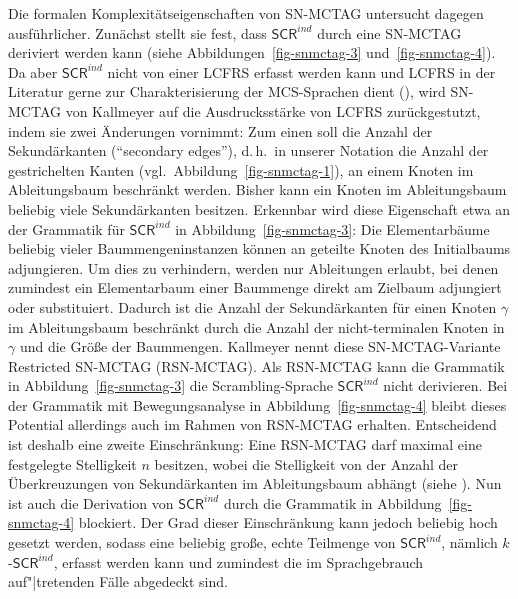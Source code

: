 Die formalen Komplexitätseigenschaften von SN-MCTAG untersucht \cite{Kallmeyer:05} dagegen ausführlicher. Zunächst stellt sie fest, dass $\mathsf{SCR}^{ind}$ durch eine SN-MCTAG deriviert werden kann (siehe Abbildungen~\ref{fig-snmctag-3} und~\ref{fig-snmctag-4}). Da aber $\mathsf{SCR}^{ind}$ nicht von einer LCFRS erfasst werden kann \citep{Becker:Rambow:Niv:92} und LCFRS in der Literatur gerne zur Charakterisierung der MCS-Sprachen dient (\citealt{Kallmeyer:10b}), wird SN-MCTAG von Kallmeyer auf die Ausdrucksstärke von LCFRS zurückgestutzt, indem sie zwei Änderungen vornimmt: Zum einen soll die Anzahl der Sekundärkanten ("`secondary edges"'), d.\,h.\ in unserer Notation die Anzahl der gestrichelten Kanten (vgl.\ Abbildung~\ref{fig-snmctag-1}), an einem Knoten im Ableitungsbaum beschränkt werden. Bisher kann ein Knoten im Ableitungsbaum beliebig viele Sekundärkanten besitzen. Erkennbar wird diese Eigenschaft etwa an der Grammatik für $\mathsf{SCR}^{ind}$ in Abbildung~\ref{fig-snmctag-3}: Die Elementarbäume beliebig vieler Baummengeninstanzen können an geteilte Knoten des Initialbaums adjungieren. Um dies zu verhindern, werden nur Ableitungen erlaubt, bei denen zumindest ein Elementarbaum einer Baummenge direkt am Zielbaum adjungiert oder substituiert. Dadurch ist die Anzahl der Sekundärkanten für einen Knoten $\gamma$ im Ableitungsbaum beschränkt durch die Anzahl der nicht-terminalen Knoten in $\gamma$ und die Grö\ss e der Baummengen. Kallmeyer nennt diese SN-MCTAG-Variante Restricted SN-MCTAG (RSN-MCTAG). Als RSN-MCTAG  kann die Grammatik in Abbildung~\ref{fig-snmctag-3} die Scrambling-Sprache $\mathsf{SCR}^{ind}$ nicht derivieren. Bei der Grammatik mit Bewegungsanalyse in Abbildung~\ref{fig-snmctag-4} bleibt dieses Potential allerdings auch im Rahmen von RSN-MCTAG erhalten. Entscheidend ist deshalb eine zweite Einschränkung: Eine RSN-MCTAG darf maximal eine festgelegte Stelligkeit $n$ besitzen, wobei die Stelligkeit von der Anzahl der Überkreuzungen von Sekundärkanten im Ableitungsbaum abhängt (siehe \citealt[212f]{Kallmeyer:05}). Nun ist auch die Derivation von $\mathsf{SCR}^{ind}$ durch die Grammatik in Abbildung~\ref{fig-snmctag-4} blockiert. Der Grad dieser Einschränkung kann jedoch beliebig hoch gesetzt werden, sodass eine beliebig gro\ss e, echte Teilmenge von $\mathsf{SCR}^{ind}$, nämlich $k$-$\mathsf{SCR}^{ind}$, erfasst werden kann und zumindest die im Sprachgebrauch auf"|tretenden Fälle abgedeckt sind. %

